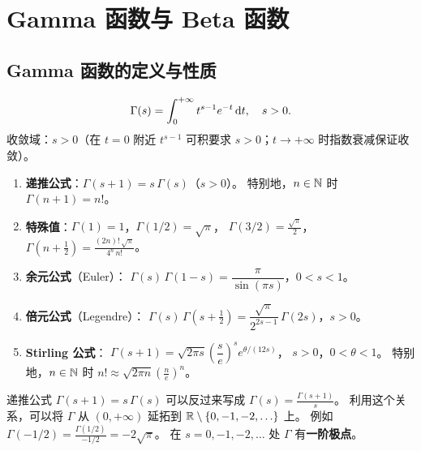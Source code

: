 \documentclass{ctexart}
\begin{document}
\section{Gamma 函数与 Beta 函数}

\subsection{Gamma 函数的定义与性质}

\begin{definition}[Gamma 函数]
  \[
    \Gamma(s) = \int_0^{+\infty} t^{s-1} e^{-t} \,\mathrm{d} t, \quad s > 0.
  \]
  收敛域：$s > 0$（在 $t=0$ 附近 $t^{s-1}$ 可积要求 $s > 0$；$t \to +\infty$ 时指数衰减保证收敛）。
\end{definition}

\begin{theorem}
  \begin{enumerate}
    \item \textbf{递推公式}：$\Gamma(s+1) = s\,\Gamma(s)$（$s > 0$）。
      特别地，$n \in \mathbb{N}$ 时 $\Gamma(n+1) = n!$。
    \item \textbf{特殊值}：$\Gamma(1) = 1$，$\Gamma(1/2) = \sqrt{\pi}$，
      $\Gamma(3/2) = \frac{\sqrt{\pi}}{2}$，
      $\Gamma(n+\frac{1}{2}) = \frac{(2n)!\,\sqrt{\pi}}{4^n\,n!}$。
    \item \textbf{余元公式}（Euler）：
      $\Gamma(s)\,\Gamma(1-s) = \dfrac{\pi}{\sin(\pi s)}$，$0 < s < 1$。
    \item \textbf{倍元公式}（Legendre）：
      $\Gamma(s)\,\Gamma\!\left(s+\frac{1}{2}\right)
      = \dfrac{\sqrt{\pi}}{2^{2s-1}}\,\Gamma(2s)$，$s > 0$。
    \item \textbf{Stirling 公式}：
      $\Gamma(s+1) = \sqrt{2\pi s}\left(\dfrac{s}{e}\right)^{\!s} e^{\theta/(12s)}$，
      $s > 0$，$0 < \theta < 1$。
      特别地，$n \in \mathbb{N}$ 时 $n! \approx \sqrt{2\pi n}\left(\frac{n}{e}\right)^n$。
  \end{enumerate}
\end{theorem}

\begin{remark}
  递推公式 $\Gamma(s+1) = s\,\Gamma(s)$ 可以反过来写成
  $\Gamma(s) = \frac{\Gamma(s+1)}{s}$。
  利用这个关系，可以将 $\Gamma$ 从 $(0,+\infty)$ 延拓到
  $\mathbb{R} \setminus \{0, -1, -2, \ldots\}$ 上。
  例如 $\Gamma(-1/2) = \frac{\Gamma(1/2)}{-1/2} = -2\sqrt{\pi}$。
  在 $s = 0, -1, -2, \ldots$ 处 $\Gamma$ 有\textbf{一阶极点}。
\end{remark}
\end{document}
